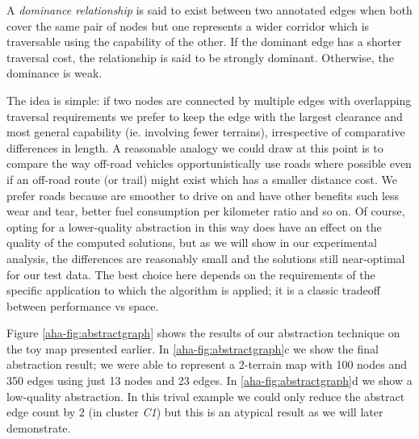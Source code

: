 {\begin{definition}
A \emph{dominance relationship} is said to exist between two annotated edges when both cover the same pair of nodes but one represents a wider corridor which is traversable using the capability of the other. If the dominant edge has a shorter traversal cost, the relationship is said to be strongly dominant. Otherwise, the dominance is weak.
\end{definition}

The idea is simple: if two nodes are connected by multiple edges with overlapping traversal requirements we prefer to keep the edge with the largest clearance and most general capability (ie. involving fewer terrains), irrespective of comparative differences in length. A reasonable analogy we could draw at this point is to compare the way off-road vehicles opportunistically use roads where possible even if an off-road route (or trail) might exist which has a smaller distance cost. We prefer roads because are smoother to drive on and have other benefits such less wear and tear, better fuel consumption per kilometer ratio and so on. Of course, opting for a lower-quality abstraction in this way does have an effect on the quality of the computed solutions, but as we will show in our experimental analysis, the differences are reasonably small and the solutions still near-optimal for our test data. The best choice here depends on the requirements of the specific application to which the algorithm is applied; it is a classic tradeoff between performance vs space.

Figure \ref{aha-fig:abstractgraph} shows the results of our abstraction technique on the toy map presented earlier. In \ref{aha-fig:abstractgraph}c we show the final abstraction result; we were able to represent a 2-terrain map with 100 nodes and 350 edges using just 13 nodes and  23 edges. In \ref{aha-fig:abstractgraph}d we show a low-quality abstraction. In this trival example we could only reduce the abstract edge count by 2 (in cluster \emph{C1}) but this is an atypical result as we will later demonstrate.

}
